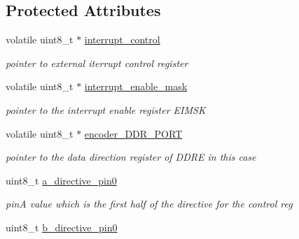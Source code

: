 \subsection*{Protected Attributes}
\begin{DoxyCompactItemize}
\item 
\hypertarget{classencoder__driver_a606073463ef8697b30565bac39e059dd}{volatile uint8\-\_\-t $\ast$ \hyperlink{classencoder__driver_a606073463ef8697b30565bac39e059dd}{interrupt\-\_\-control}}\label{classencoder__driver_a606073463ef8697b30565bac39e059dd}

\begin{DoxyCompactList}\small\item\em pointer to external iterrupt control register \end{DoxyCompactList}\item 
\hypertarget{classencoder__driver_a2629f05f0f809f90069a0da3aa4c6acb}{volatile uint8\-\_\-t $\ast$ \hyperlink{classencoder__driver_a2629f05f0f809f90069a0da3aa4c6acb}{interrupt\-\_\-enable\-\_\-mask}}\label{classencoder__driver_a2629f05f0f809f90069a0da3aa4c6acb}

\begin{DoxyCompactList}\small\item\em pointer to the interrupt enable register E\-I\-M\-S\-K \end{DoxyCompactList}\item 
\hypertarget{classencoder__driver_a1ca6e426bbbca82caa52001394db4ccf}{volatile uint8\-\_\-t $\ast$ \hyperlink{classencoder__driver_a1ca6e426bbbca82caa52001394db4ccf}{encoder\-\_\-\-D\-D\-R\-\_\-\-P\-O\-R\-T}}\label{classencoder__driver_a1ca6e426bbbca82caa52001394db4ccf}

\begin{DoxyCompactList}\small\item\em pointer to the data direction register of D\-D\-R\-E in this case \end{DoxyCompactList}\item 
\hypertarget{classencoder__driver_aefddb744279afdf293e73e7a422a6d1d}{uint8\-\_\-t \hyperlink{classencoder__driver_aefddb744279afdf293e73e7a422a6d1d}{a\-\_\-directive\-\_\-pin0}}\label{classencoder__driver_aefddb744279afdf293e73e7a422a6d1d}

\begin{DoxyCompactList}\small\item\em pin\-A value which is the first half of the directive for the control reg \end{DoxyCompactList}\item 
\hypertarget{classencoder__driver_a7c03ecdcad5ccd33e91546fb7a6373ba}{uint8\-\_\-t \hyperlink{classencoder__driver_a7c03ecdcad5ccd33e91546fb7a6373ba}{b\-\_\-directive\-\_\-pin0}}\label{classencoder__driver_a7c03ecdcad5ccd33e91546fb7a6373ba}


\end{DoxyCompactItemize}
